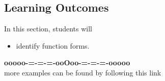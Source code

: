 \documentclass{ximera}
\begin{document}
\subsection*{Learning Outcomes}


\begin{sectionOutcomes}
In this section, students will 

\begin{itemize}
\item identify function forms.
\end{itemize}
\end{sectionOutcomes}












\begin{center}
\textbf{\textcolor{green!50!black}{ooooo-=-=-=-ooOoo-=-=-=-ooooo}} \\

more examples can be found by following this link\\ 

\end{center}
\end{document}

